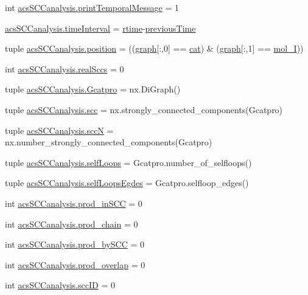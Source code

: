 \begin{DoxyCompactItemize}
\item 
int \hyperlink{a00130_a3de1ee32e24403b152d565d8c52cf7fd}{acs\+S\+C\+Canalysis.\+print\+Temporal\+Message} = 1
\item 
\hyperlink{a00130_a7d0f86310c439e970e0b41121364027c}{acs\+S\+C\+Canalysis.\+time\+Interval} = \hyperlink{a00028_afc6b38657a313b9f1de2ee356910b6ee}{rtime}-\/\hyperlink{a00028_a17b8652a085b5add031a40fb1c9a680e}{previous\+Time}
\item 
tuple \hyperlink{a00130_ac09e85f8df5b7c8c7d2caf87e9193421}{acs\+S\+C\+Canalysis.\+position} = ((\hyperlink{a00028_a2745e24fec2a44d51f4452beb1596bd3}{graph}\mbox{[}\+:,0\mbox{]} == \hyperlink{a00028_a7073f71a43389f3032e69b1fffc2551a}{cat}) \& (\hyperlink{a00028_a2745e24fec2a44d51f4452beb1596bd3}{graph}\mbox{[}\+:,1\mbox{]} == \hyperlink{a00028_ab346189eef5359a07ba32144ddcd4465}{mol\+\_\+\+I}))
\item 
int \hyperlink{a00130_ac6aaa0ac5d13b0736ab3179dc1ed388d}{acs\+S\+C\+Canalysis.\+real\+Sccs} = 0
\item 
tuple \hyperlink{a00130_ad88c3dd8eb89ddbe8720462b03f35003}{acs\+S\+C\+Canalysis.\+Gcatpro} = nx.\+Di\+Graph()
\item 
tuple \hyperlink{a00130_a2094b7f0917a16a948a2d1c4d700e84c}{acs\+S\+C\+Canalysis.\+scc} = nx.\+strongly\+\_\+connected\+\_\+components(Gcatpro)
\item 
tuple \hyperlink{a00130_a185cbf8ef1ec67f52695562582418793}{acs\+S\+C\+Canalysis.\+scc\+N} = nx.\+number\+\_\+strongly\+\_\+connected\+\_\+components(Gcatpro)
\item 
tuple \hyperlink{a00130_a8fec45ae9b70981ce94eaeed14d888b1}{acs\+S\+C\+Canalysis.\+self\+Loops} = Gcatpro.\+number\+\_\+of\+\_\+selfloops()
\item 
tuple \hyperlink{a00130_ad34596e89eef2cfb696f61a810765c7a}{acs\+S\+C\+Canalysis.\+self\+Loops\+Egdes} = Gcatpro.\+selfloop\+\_\+edges()
\item 
int \hyperlink{a00130_adbc76b0558ceb74d798b35146a583474}{acs\+S\+C\+Canalysis.\+prod\+\_\+in\+S\+C\+C} = 0
\item 
int \hyperlink{a00130_ab307c6047e4d16ec0335266b24e7db5a}{acs\+S\+C\+Canalysis.\+prod\+\_\+chain} = 0
\item 
int \hyperlink{a00130_abb2ac92624837ae48b882d145c5aab11}{acs\+S\+C\+Canalysis.\+prod\+\_\+by\+S\+C\+C} = 0
\item 
int \hyperlink{a00130_a213e964195f0666d00663ca874a09caa}{acs\+S\+C\+Canalysis.\+prod\+\_\+overlap} = 0
\item 
int \hyperlink{a00130_a1dd3c43841ba4485a66889600f099a0c}{acs\+S\+C\+Canalysis.\+scc\+I\+D} = 0

\end{DoxyCompactItemize}

